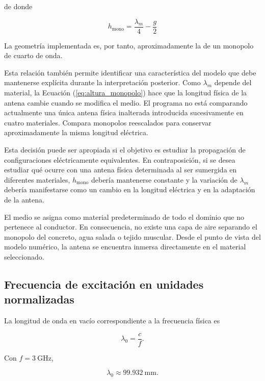 de donde

\begin{equation}
\boxed{
h_{\mathrm{mono}}
=
\frac{\lambda_m}{4}
-
\frac{g}{2}
}
\label{eq:altura_monopolo}
\end{equation}

La geometría implementada es, por tanto, aproximadamente la de un monopolo de cuarto de onda.

Esta relación también permite identificar una característica del modelo que debe mantenerse explícita durante la interpretación posterior. Como $\lambda_m$ depende del material, la Ecuación (\ref{eq:altura_monopolo}) hace que la longitud física de la antena cambie cuando se modifica el medio. El programa no está comparando actualmente una única antena física inalterada introducida sucesivamente en cuatro materiales. Compara monopolos reescalados para conservar aproximadamente la misma longitud eléctrica.

Esta decisión puede ser apropiada si el objetivo es estudiar la propagación de configuraciones eléctricamente equivalentes. En contraposición, si se desea estudiar qué ocurre con una antena física determinada al ser sumergida en diferentes materiales, $h_{\mathrm{mono}}$ debería mantenerse constante y la variación de $\lambda_m$ debería manifestarse como un cambio en la longitud eléctrica y en la adaptación de la antena.

El medio se asigna como material predeterminado de todo el dominio que no pertenece al conductor. En consecuencia, no existe una capa de aire separando el monopolo del concreto, agua salada o tejido muscular. Desde el punto de vista del modelo numérico, la antena se encuentra inmersa directamente en el material seleccionado.

\subsection{Frecuencia de excitación en unidades normalizadas}

La longitud de onda en vacío correspondiente a la frecuencia física es

\begin{equation}
\lambda_0
=
\frac{c}{f}.
\end{equation}

Con $f=3~\mathrm{GHz}$,

\begin{equation}
\lambda_0
\approx
99.932~\mathrm{mm}.
\end{equation}

